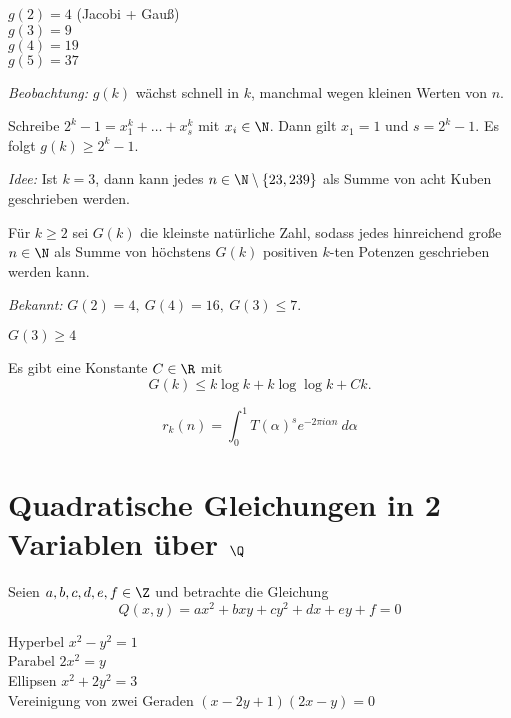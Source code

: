 \begin{exmp*}
	$g(2) = 4$ (Jacobi + Gauß)\\
	\( g(3) = 9 \)\\
	\( g(4) = 19 \)\\
	\( g(5) = 37 \)
\end{exmp*}

\emph{Beobachtung:} $g(k)$ wächst schnell in $k$, manchmal wegen kleinen Werten von $n$.

\begin{exmp*}
	Schreibe $2^k-1 = x_1^k + \dotsc + x_s^k$ mit $x_i \in \N$. Dann gilt $x_1 = 1$ und $s = 2^k-1$. Es folgt $g(k) \geq 2^k-1$.
\end{exmp*}

\emph{Idee:} Ist $k = 3$, dann kann jedes $n \in \N \setminus \{23,239\}$ als Summe von acht Kuben geschrieben werden.

\begin{defn*}
	Für $k \geq 2$ sei $G(k)$ die kleinste natürliche Zahl, sodass jedes hinreichend große $n \in \N$ als Summe von höchstens $G(k)$ positiven $k$-ten Potenzen geschrieben werden kann.
\end{defn*}

\emph{Bekannt:} $G(2) = 4,\ G(4) = 16,\ G(3) \leq 7$.

\begin{lem}\autolabel
	$G(3) \geq 4$
\end{lem}

\begin{thm*}
	Es gibt eine Konstante $C \in \R$ mit
	\[ G(k) \leq k \log k + k \log\log k + Ck. \]
\end{thm*}

\begin{lem*}
	\[ r_k(n) = \int_{0}^{1} T(\alpha)^s e^{-2\pi i \alpha n} \ d\alpha\]
\end{lem*}

\section{Quadratische Gleichungen in 2 Variablen über $\Q$}

Seien $a,b,c,d,e,f \in \Z$ und betrachte die Gleichung 
\[ Q(x,y) = ax^2+bxy+cy^2+dx+ey+f = 0 \]

\begin{exmp*}
	Hyperbel $x^2-y^2 = 1$\\
	Parabel $2x^2=y$\\
	Ellipsen $x^2+2y^2=3$\\
	Vereinigung von zwei Geraden $(x-2y+1)(2x-y)=0$
\end{exmp*}

